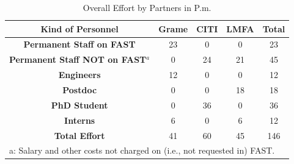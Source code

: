 \documentclass[a4paper,9pt]{extarticle}
\newcommand{\PP}{FAST}
\begin{document}

\begin{table}
\begin{center}
\begin{tabular}{c | c c c | c}
\textbf{Kind of Personnel} & \textbf{Grame} & \textbf{CITI} & \textbf{LMFA} & \textbf{Total}\\
\hline
\hline
\textbf{Permanent Staff on \PP{}} & 23 & 0 & 0 & 23\\
\textbf{Permanent Staff NOT on \PP{}$^a$} & 0 & 24 & 21 & 45\\
\textbf{Engineers} & 12 & 0 & 0 & 12\\
\textbf{Postdoc} & 0 & 0 & 18 & 18\\
\textbf{PhD Student} & 0 & 36 & 0 & 36\\
\textbf{Interns} & 6 & 0 & 6 & 12\\
\hline
\textbf{Total Effort} & 41 & 60 & 45 & 146\\
\hline
\multicolumn{5}{l}{a: Salary and other costs not charged on (i.e., not requested in) \PP{}.}
\end{tabular}
\end{center}
\caption{Overall Effort by Partners in P.m.}
\label{tab:effort}
\end{table}
\end{document}
